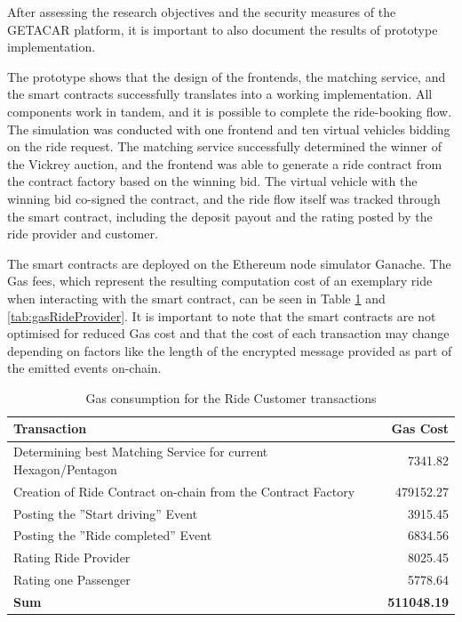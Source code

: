 After assessing  the research objectives and the security measures of the GETACAR platform, it is important to also document the results of prototype implementation. 

The prototype shows that the design of the frontends, the matching service, and the smart contracts successfully translates into a working implementation. All components work in tandem, and it is possible to complete the ride-booking flow. The simulation was conducted with one frontend and ten virtual vehicles bidding on the ride request. The matching service successfully determined the winner of the Vickrey auction, and the frontend was able to generate a ride contract from the contract factory based on the winning bid. The virtual vehicle with the winning bid co-signed the contract, and the ride flow itself was tracked through the smart contract, including the deposit payout and the rating posted by the ride provider and customer.

The smart contracts are deployed on the Ethereum node simulator Ganache. The Gas fees, which represent the resulting computation cost of an exemplary ride when interacting with the smart contract, can be seen in Table \ref{tab:gasCustomer} and \ref{tab:gasRideProvider}. It is important to note that the smart contracts are not optimised for reduced Gas cost and that the cost of each transaction may change depending on factors like the length of the encrypted message provided as part of the emitted events on-chain.

\begin{table}[H]
\centering
\begin{tabular}{|l|r|}
\hline
\textbf{Transaction} & \textbf{Gas Cost} \\
\hline
Determining best Matching Service for current Hexagon/Pentagon & 7341.82 \\
\hline
Creation of Ride Contract on-chain from the Contract Factory& 479152.27 \\
\hline
Posting the ''Start driving'' Event& 3915.45 \\
\hline
Posting the ''Ride completed'' Event & 6834.56 \\
\hline
Rating Ride Provider & 8025.45 \\
\hline
Rating one Passenger & 5778.64 \\
\hline
\hline
\textbf{Sum}  & \textbf{511048.19} \\
\hline
\end{tabular}
\caption{Gas consumption for the Ride Customer transactions}
\label{tab:gasCustomer}
\end{table}


